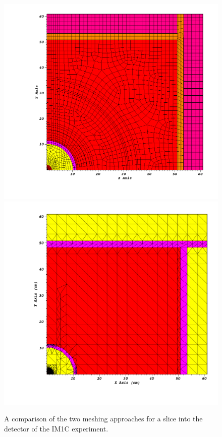 \documentclass[11pt, letterpaper,titlepage,oneside]{article}
\begin{document}
\begin{figure}[H]
\centering
  \includegraphics[scale=0.17]{../figures/im1_cubit_slice.png}
  \includegraphics[scale=0.17]{../figures/im1c_prism_slice_q.png}
  \caption{A comparison of the two meshing approaches for a slice into the detector of the IM1C experiment.}
  \label{comparison_slice}
\end{figure}
\end{document}
